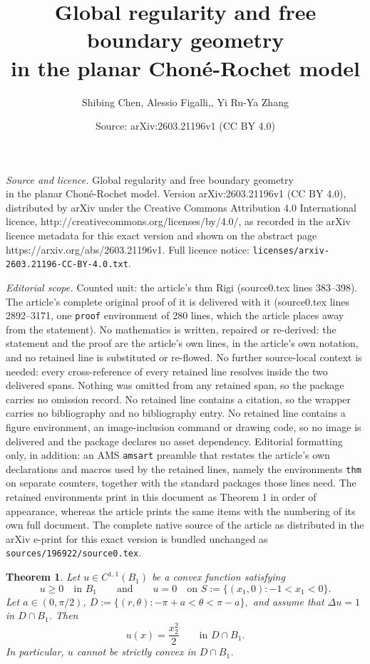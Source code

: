\documentclass[10pt,a4paper]{amsart}
\title{Global regularity and free boundary geometry \\ in the planar Chon\'e-Rochet model}
\author{Shibing Chen, Alessio Figalli,, Yi Ru-Ya Zhang}
\date{Source: arXiv:2603.21196v1 (CC BY 4.0)}
\newtheorem{thm}{Theorem}
\begin{document}
\maketitle

\noindent\emph{Source and licence.} Global regularity and free boundary geometry \\ in the planar Chon\'e-Rochet model. Version arXiv:2603.21196v1 (CC BY 4.0), distributed by arXiv under the Creative Commons Attribution 4.0 International licence, http://creativecommons.org/licenses/by/4.0/, as recorded in the arXiv licence metadata for this exact version and shown on the abstract page https://arxiv.org/abs/2603.21196v1. Full licence notice: \texttt{licenses/arxiv-2603.21196-CC-BY-4.0.txt}.\par\smallskip

\noindent\textit{Editorial scope.} Counted unit: the article's thm Rigi (source0.tex lines 383--398). The article's complete original proof of it is delivered with it (source0.tex lines 2892--3171, one \texttt{proof} environment of 280 lines, which the article places away from the statement). No mathematics is written, repaired or re-derived: the statement and the proof are the article's own lines, in the article's own notation, and no retained line is substituted or re-flowed.  No further source-local context is needed: every cross-reference of every retained line resolves inside the two delivered spans.  Nothing was omitted from any retained span, so the package carries no omission record.  No retained line contains a citation, so the wrapper carries no bibliography and no bibliography entry.  No retained line contains a figure environment, an image-inclusion command or drawing code, so no image is delivered and the package declares no asset dependency.  Editorial formatting only, in addition: an AMS \texttt{amsart} preamble that restates the article's own declarations and macros used by the retained lines, namely the environments \texttt{thm} on separate counters, together with the standard packages those lines need.  The retained environments print in this document as Theorem 1 in order of appearance, whereas the article prints the same items with the numbering of its own full document.  The complete native source of the article as distributed in the arXiv e-print for this exact version is bundled unchanged as \texttt{sources/196922/source0.tex}.
\begin{thm}\label{Rigi}
Let $u\in C^{1,1}(B_1)$ be a convex function satisfying
\[
u\ge 0 \quad\text{in }B_1\qquad\text{and}
\qquad
u=0 \quad\text{on } S:=\{(x_1,0): -1<x_1<0\}.
\]
Let $a\in(0,\pi/2)$, 
$D:=\{(r,\theta): -\pi+a<\theta<\pi-a\},$
and assume that $\Delta u=1$ in $D\cap B_1$. Then
\[
u(x)=\frac{x_2^2}{2}
\qquad\text{in }D\cap B_1.
\]
In particular, $u$ cannot be strictly convex in $D\cap B_1$.
\end{thm}
\end{document}
